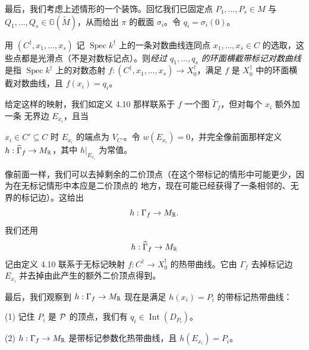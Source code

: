 
最后，我们考虑上述情形的一个装饰。回忆我们已固定点 $P_1,\dots,P_s \in M$ 与
$Q_1,\dots,Q_s \in \mathbb{G}(\widetilde{M})$，从而给出 $\pi$ 的截面 $\sigma_i$。令 $q_i = \sigma_i(0)$。

\begin{definition}
用 $(C^{\dagger},x_1,\dots,x_s)$ 记 $\operatorname{Spec}k^{\dagger}$ 上的一条对数曲线连同点
$x_1,\dots,x_s \in C$ 的选取，这些点都是光滑点（不是对数标记点）。则\emph{经过
$q_1,\dots,q_s$ 的环面横截带标记对数曲线}是指 $\operatorname{Spec}k^{\dagger}$ 上的对数态射
$f : (C^{\dagger},x_1,\dots,x_s) \to X_0^{\dagger}$，满足 $f$ 是 $X_0^{\dagger}$ 中的环面横截对数曲线，且
$f(x_i) = q_i$。
\end{definition}

给定这样的映射，我们如定义 4.10 那样联系于 $f$ 一个图 $\widetilde{\Gamma}_f$，但对每个 $x_i$ 额外加一条
无界边 $E_{x_i}$，且当

$x_i\in C'\subseteq C$ 时 $E_{x_i}$ 的端点为 $V_{C'}$。令 $w(E_{x_i}) = 0$，并完全像前面那样定义
$h : \widetilde{\Gamma}_f \to M_{\mathbb{R}}$，其中 $h|_{E_{x_i}}$ 为常值。

像前面一样，我们可以去掉剩余的二价顶点（在这个带标记的情形中可能更少，因为在无标记情形中本应是二价顶点的
地方，现在可能已经获得了一条相邻的、无界的标记边）。这给出
\[
h : \Gamma_f \to M_{\mathbb{R}}.
\]
我们还用
\[
h : \widehat{\Gamma}_f \to M_{\mathbb{R}}
\]
记由定义 4.10 联系于无标记映射 $f : C^{\dagger} \to X_0^{\dagger}$ 的热带曲线。它由 $\Gamma_f$ 去掉标记边
$E_{x_i}$ 并去掉由此产生的额外二价顶点得到。

最后，我们观察到 $h : \Gamma_f \to M_{\mathbb{R}}$ 现在是满足 $h(x_i) = P_i$ 的带标记热带曲线：

\begin{proposition}
(1) 记住 $P_i$ 是 $\mathcal{P}$ 的顶点，我们有 $q_i \in \operatorname{Int}(D_{P_i})$。

(2) $h : \Gamma_f \to M_{\mathbb{R}}$ 是带标记参数化热带曲线，且 $h(E_{x_i}) = P_i$。
\end{proposition}

